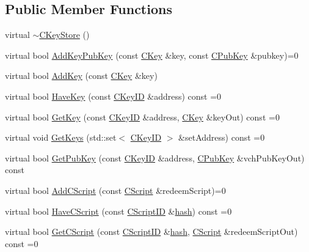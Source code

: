 \subsection*{Public Member Functions}
\begin{DoxyCompactItemize}
\item 
virtual \hyperlink{class_c_key_store_a9bfaef2bcd6effc467a96043f44044a0}{$\sim$\+C\+Key\+Store} ()
\item 
virtual bool \hyperlink{class_c_key_store_a1956e4f5860ded321d6f697047d8236a}{Add\+Key\+Pub\+Key} (const \hyperlink{class_c_key}{C\+Key} \&key, const \hyperlink{class_c_pub_key}{C\+Pub\+Key} \&pubkey)=0
\item 
virtual bool \hyperlink{class_c_key_store_a0b4ca43724cfcc6e2ea70c0baa192750}{Add\+Key} (const \hyperlink{class_c_key}{C\+Key} \&key)
\item 
virtual bool \hyperlink{class_c_key_store_a9398451d4270fae27b29f686a9d43a65}{Have\+Key} (const \hyperlink{class_c_key_i_d}{C\+Key\+I\+D} \&address) const =0
\item 
virtual bool \hyperlink{class_c_key_store_a2dffca468fef2e5da2e42a7c983d968a}{Get\+Key} (const \hyperlink{class_c_key_i_d}{C\+Key\+I\+D} \&address, \hyperlink{class_c_key}{C\+Key} \&key\+Out) const =0
\item 
virtual void \hyperlink{class_c_key_store_aca5044014720308f191113e7ba297d13}{Get\+Keys} (std\+::set$<$ \hyperlink{class_c_key_i_d}{C\+Key\+I\+D} $>$ \&set\+Address) const =0
\item 
virtual bool \hyperlink{class_c_key_store_aba866c1e71c129e7ac2d5d1e5223c8a5}{Get\+Pub\+Key} (const \hyperlink{class_c_key_i_d}{C\+Key\+I\+D} \&address, \hyperlink{class_c_pub_key}{C\+Pub\+Key} \&vch\+Pub\+Key\+Out) const 
\item 
virtual bool \hyperlink{class_c_key_store_a2fb2e02e8cdc364607efd5ebb14b8064}{Add\+C\+Script} (const \hyperlink{class_c_script}{C\+Script} \&redeem\+Script)=0
\item 
virtual bool \hyperlink{class_c_key_store_a51c9fc86b2c3fece10d86146231fa58d}{Have\+C\+Script} (const \hyperlink{class_c_script_i_d}{C\+Script\+I\+D} \&\hyperlink{cache_8cc_a11ecb029164e055f28f4123ce3748862}{hash}) const =0
\item 
virtual bool \hyperlink{class_c_key_store_ae6bf4dbeb0705e199250e48aa5d34264}{Get\+C\+Script} (const \hyperlink{class_c_script_i_d}{C\+Script\+I\+D} \&\hyperlink{cache_8cc_a11ecb029164e055f28f4123ce3748862}{hash}, \hyperlink{class_c_script}{C\+Script} \&redeem\+Script\+Out) const =0
\item 

\end{DoxyCompactItemize}
